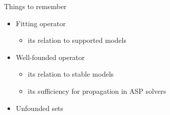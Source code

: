 \begin{frame}{Things to remember}
  \bigskip
  \begin{itemize}
  \item Fitting operator
    \begin{itemize}\normalsize
    \item its relation to supported models
    \end{itemize}
    \smallskip
  \item Well-founded operator
    \begin{itemize}\normalsize
    \item its relation to stable models
    \item its sufficiency for propagation in ASP solvers
    \end{itemize}
    \smallskip
  \item Unfounded sets
  \end{itemize}
\end{frame}
%
